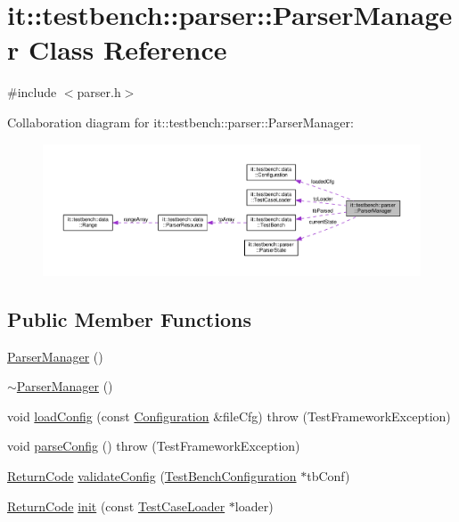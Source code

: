 \hypertarget{classit_1_1testbench_1_1parser_1_1ParserManager}{\section{it\-:\-:testbench\-:\-:parser\-:\-:Parser\-Manager Class Reference}
\label{d2/d53/classit_1_1testbench_1_1parser_1_1ParserManager}
}


{\ttfamily \#include $<$parser.\-h$>$}



Collaboration diagram for it\-:\-:testbench\-:\-:parser\-:\-:Parser\-Manager\-:
\nopagebreak
\begin{figure}[H]
\begin{center}
\leavevmode
\includegraphics[width=350pt]{d4/dcf/classit_1_1testbench_1_1parser_1_1ParserManager__coll__graph}
\end{center}
\end{figure}
\subsection*{Public Member Functions}
\begin{DoxyCompactItemize}
\item 
\hyperlink{classit_1_1testbench_1_1parser_1_1ParserManager_a6113cfe5e4264ea5909ce228273ae77a}{Parser\-Manager} ()
\item 
\hyperlink{classit_1_1testbench_1_1parser_1_1ParserManager_af4130165f1d11bd66d23b13fc08f8a3d}{$\sim$\-Parser\-Manager} ()
\item 
void \hyperlink{classit_1_1testbench_1_1parser_1_1ParserManager_a7294575996b21ce73583da991de108ca}{load\-Config} (const \hyperlink{structit_1_1testbench_1_1data_1_1Configuration}{Configuration} \&file\-Cfg)  throw (\-Test\-Framework\-Exception)
\item 
void \hyperlink{classit_1_1testbench_1_1parser_1_1ParserManager_a62b50936918fa3484f62c470fe4bb57a}{parse\-Config} ()  throw (\-Test\-Framework\-Exception)
\item 
\hyperlink{structit_1_1testbench_1_1data_1_1ReturnCode}{Return\-Code} \hyperlink{classit_1_1testbench_1_1parser_1_1ParserManager_a4b0eb91653f8393f199546e6d4b76a34}{validate\-Config} (\hyperlink{classit_1_1testbench_1_1data_1_1TestBenchConfiguration}{Test\-Bench\-Configuration} $\ast$tb\-Conf)
\item 
\hyperlink{structit_1_1testbench_1_1data_1_1ReturnCode}{Return\-Code} \hyperlink{classit_1_1testbench_1_1parser_1_1ParserManager_aa8acbb8b2c903b265f177e3fb72e0524}{init} (const \hyperlink{classit_1_1testbench_1_1data_1_1TestCaseLoader}{Test\-Case\-Loader} $\ast$loader)
\end{DoxyCompactItemize}
